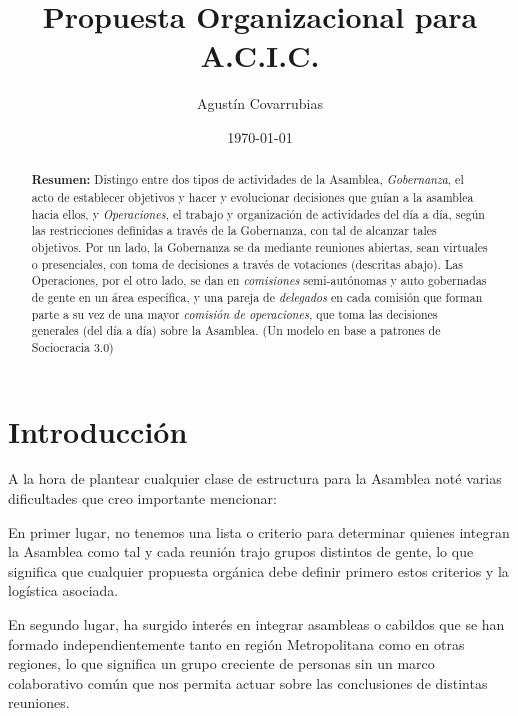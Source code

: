\documentclass[justified]{tufte-handout} %
\title{Propuesta Organizacional para A.C.I.C.}
\author{Agustín Covarrubias}
\date{\today} %
\begin{document}
\maketitle %
\begin{abstract}
	\textbf{Resumen:}
	Distingo entre dos tipos de actividades de la Asamblea, \textit{Gobernanza}, el acto de establecer objetivos y hacer y evolucionar decisiones que guían a la asamblea hacia ellos, y \textit{Operaciones}, el trabajo y organización de actividades del día a día, según las restricciones definidas a través de la Gobernanza, con tal de alcanzar tales objetivos. Por un lado, la Gobernanza se da mediante reuniones abiertas, sean virtuales o presenciales, con toma de decisiones a través de votaciones (descritas abajo). Las Operaciones, por el otro lado, se dan en \textit{comisiones} semi-autónomas y auto gobernadas de gente en un área específica, y una pareja de \textit{delegados} en cada comisión que forman parte a su vez de una mayor \textit{comisión de operaciones}, que toma las decisiones generales (del día a día) sobre la Asamblea. (Un modelo en base a patrones de Sociocracia 3.0)
\end{abstract}

\section{Introducción}\label{sec:introduccion}

A la hora de plantear cualquier clase de estructura para la Asamblea noté varias dificultades que creo importante mencionar:

En primer lugar, no tenemos una lista o criterio para determinar quienes integran la Asamblea como tal y cada reunión trajo grupos distintos de gente, lo que significa que cualquier propuesta orgánica debe definir primero estos criterios y la logística asociada.

En segundo lugar, ha surgido interés en integrar asambleas o cabildos que se han formado independientemente tanto en región Metropolitana como en otras regiones, lo que significa un grupo creciente de personas sin un marco colaborativo común que nos permita actuar sobre las conclusiones de distintas reuniones.
\end{document}
